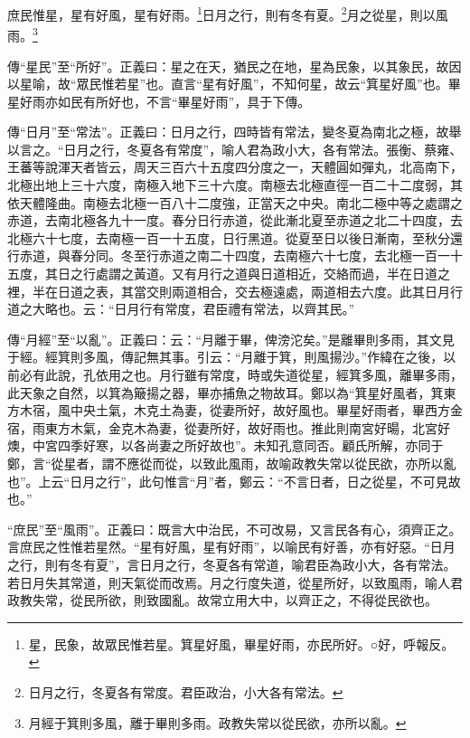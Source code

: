 庶民惟星，星有好風，星有好雨。\footnote{星，民象，故眾民惟若星。箕星好風，畢星好雨，亦民所好。○好，呼報反。}日月之行，則有冬有夏。\footnote{日月之行，冬夏各有常度。君臣政治，小大各有常法。}月之從星，則以風雨。\footnote{月經于箕則多風，離于畢則多雨。政教失常以從民欲，亦所以亂。}

{\noindent\zhuan{}\fzbyks 傳“星民”至“所好”。正義曰：星之在天，猶民之在地，星為民象，以其象民，故因以星喻，故“眾民惟若星”也。直言“星有好風”，不知何星，故云“箕星好風”也。畢星好雨亦如民有所好也，不言“畢星好雨”，具于下傳。 \par}

{\noindent\zhuan{}\fzbyks 傳“日月”至“常法”。正義曰：日月之行，四時皆有常法，變冬夏為南北之極，故舉以言之。“日月之行，冬夏各有常度”，喻人君為政小大，各有常法。張衡、蔡雍、王蕃等說渾天者皆云，周天三百六十五度四分度之一，天體圓如彈丸，北高南下，北極出地上三十六度，南極入地下三十六度。南極去北極直徑一百二十二度弱，其依天體隆曲。南極去北極一百八十二度強，正當天之中央。南北二極中等之處謂之赤道，去南北極各九十一度。春分日行赤道，從此漸北夏至赤道之北二十四度，去北極六十七度，去南極一百一十五度，日行黑道。從夏至日以後日漸南，至秋分還行赤道，與春分同。冬至行赤道之南二十四度，去南極六十七度，去北極一百一十五度，其日之行處謂之黃道。又有月行之道與日道相近，交絡而過，半在日道之裡，半在日道之表，其當交則兩道相合，交去極遠處，兩道相去六度。此其日月行道之大略也。云：“日月行有常度，君臣禮有常法，以齊其民。” \par}

{\noindent\zhuan{}\fzbyks 傳“月經”至“以亂”。正義曰：云：“月離于畢，俾滂沱矣。”是離畢則多雨，其文見于經。經箕則多風，傳記無其事。引云：“月離于箕，則風揚沙。”作緯在之後，以前必有此說，孔依用之也。月行雖有常度，時或失道從星，經箕多風，離畢多雨，此天象之自然，以箕為簸揚之器，畢亦捕魚之物故耳。鄭以為“箕星好風者，箕東方木宿，風中央土氣，木克土為妻，從妻所好，故好風也。畢星好雨者，畢西方金宿，雨東方木氣，金克木為妻，從妻所好，故好雨也。推此則南宮好暘，北宮好燠，中宮四季好寒，以各尚妻之所好故也”。未知孔意同否。顧氏所解，亦同于鄭，言“從星者，謂不應從而從，以致此風雨，故喻政教失常以從民欲，亦所以亂也”。上云“日月之行”，此句惟言“月”者，鄭云：“不言日者，日之從星，不可見故也。” \par}

{\noindent\shu{}\fzkt “庶民”至“風雨”。正義曰：既言大中治民，不可改易，又言民各有心，須齊正之。言庶民之性惟若星然。“星有好風，星有好雨”，以喻民有好善，亦有好惡。“日月之行，則有冬有夏”，言日月之行，冬夏各有常道，喻君臣為政小大，各有常法。若日月失其常道，則天氣從而改焉。月之行度失道，從星所好，以致風雨，喻人君政教失常，從民所欲，則致國亂。故常立用大中，以齊正之，不得從民欲也。 \par}

